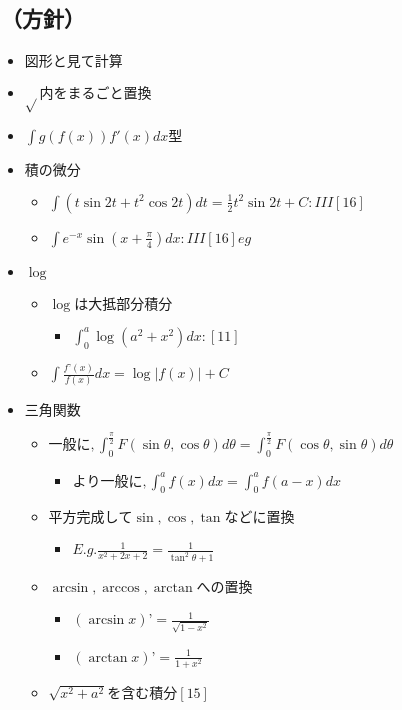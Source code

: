 \documentclass[dvipdfmx,uplatex]{jsarticle}
\begin{document}
\subsection{（方針）}
\begin{itemize}
	\item $ 図形と見て計算$
	\item $ \sqrt{} 内をまるごと置換$
	\item $ \int g(f(x))f'(x)dx 型$
	\item $ 積の微分$
	\begin{itemize}
		\item $\int (t \sin 2t + t^2 \cos 2t)dt = \frac{1}{2} t^2 \sin 2t +C :III[16]$
		\item $\int e^{-x} \sin (x + \frac{ \pi }{4})dx :III[16]eg$
	\end{itemize}
	\item $ \log$
	\begin{itemize}
		\item $ \log は大抵部分積分$
		\begin{itemize}
			\item $\int^a_0 \log (a^2+x^2) dx:[11]$
		\end{itemize}
		\item $ \int \frac{f’(x)}{f(x)}dx = \log |f(x)| + C$
	\end{itemize}
	\item $ 三角関数$
	\begin{itemize}
		\item $ 一般に, \int^{\frac{\pi}{2}}_0 F(\sin \theta, \cos \theta)d \theta = \int^{\frac{\pi}{2}}_0 F(\cos \theta, \sin \theta)d \theta$
		\begin{itemize}
			\item $ より一般に, \int^a_0 f(x)dx = \int^a_0 f(a-x)dx$
		\end{itemize}
		\item $ 平方完成して \sin , \cos , \tan などに置換$
		\begin{itemize}
			\item $ E.g. \frac{1}{x^2+2x+2} = \frac{1}{\tan^2 \theta + 1}$
		\end{itemize}
		\item $ \arcsin, \arccos, \arctan への置換$
		\begin{itemize}
			\item $ (\arcsin x)’ = \frac{1}{\sqrt{1 - x^2}}$
			\item $ (\arctan x)’ = \frac{1}{1 + x^2}$
		\end{itemize}
		\item $ \sqrt{x^2 + a^2} を含む積分 [15]$

\end{itemize}
\end{itemize}
\end{document}
